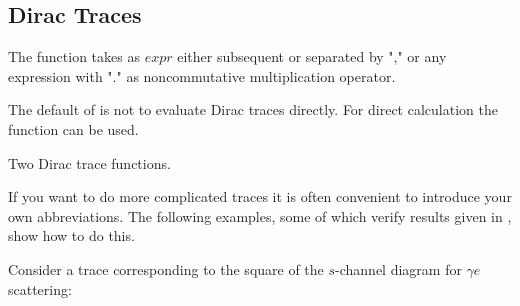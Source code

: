 \subsection{Dirac Traces}
\label{traces}

The function  takes as $expr$ either subsequent  or  separated by "," or any expression with "." as
 noncommutative multiplication operator.

The default of  is not to evaluate Dirac traces directly.
For direct calculation the function  can be used.

 {Two Dirac trace functions.}

\beom
{}
\enom

If you want to do more complicated traces it is often convenient to introduce your own abbreviations. The following examples, some of which verify results given in \cite{Wo79}, show how to do this. 

Consider a trace corresponding to the square of the $s$-channel diagram for $\gamma e$ scattering:

